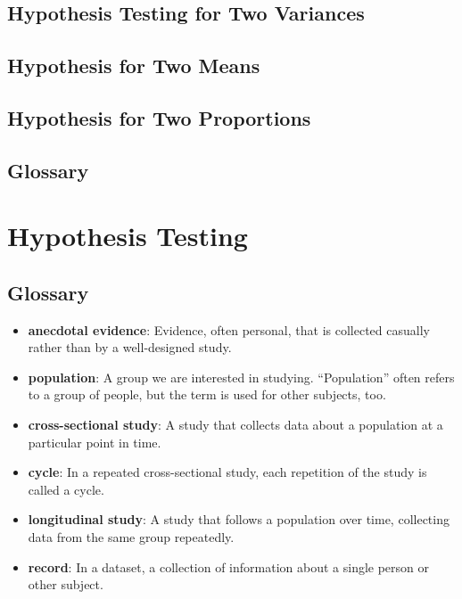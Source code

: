 \section{Hypothesis Testing for Two Variances}
\section{Hypothesis for Two Means}
\section{Hypothesis for Two Proportions}
\section*{Glossary} 

 \chapter{Hypothesis Testing}  \section*{Glossary} \begin{itemize}
	
	\item {\bf anecdotal evidence}: Evidence, often personal, that is collected
	casually rather than by a well-designed study.
	
	\item {\bf population}: A group we are interested in studying.
	``Population'' often refers to a
	group of people, but the term is used for other subjects,
	too.
	
	\item {\bf cross-sectional study}: A study that collects data about a
	population at a particular point in time.
	
	\item {\bf cycle}: In a repeated cross-sectional study, each repetition
	of the study is called a cycle.
	
	\item {\bf longitudinal study}: A study that follows a population over
	time, collecting data from the same group repeatedly.
	
	\item {\bf record}: In a dataset, a collection of information about
	a single person or other subject.
	

\end{itemize}
